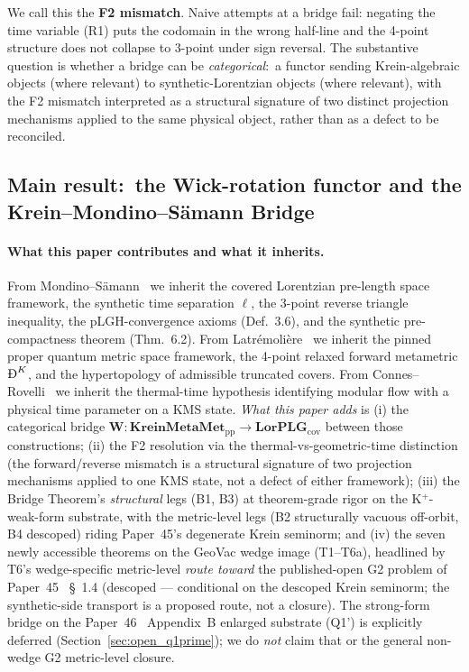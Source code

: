 \documentclass[11pt,a4paper]{article}
\theoremstyle{plain}
\theoremstyle{definition}
\newcommand{\BigDeth}{\text{\DJ}^{K}}
\newcommand{\Wfun}{\mathbf{W}}
\newcommand{\KreinMM}{\mathbf{KreinMetaMet}_{\mathrm{pp}}}
\newcommand{\LorPLG}{\mathbf{LorPLG}_{\mathrm{cov}}}
\begin{document}
We call this the \textbf{F2 mismatch}. Naive attempts at a bridge fail:
negating the time variable (R1) puts the codomain in the wrong
half-line and the 4-point structure does not collapse to 3-point under
sign reversal. The substantive question is whether a bridge can be
\emph{categorical}:\ a functor sending Krein-algebraic objects (where
relevant) to synthetic-Lorentzian objects (where relevant), with the
F2 mismatch interpreted as a structural signature of two distinct
projection mechanisms applied to the same physical object, rather than
as a defect to be reconciled.

\subsection{Main result:\ the Wick-rotation functor and the
Krein--Mondino--S\"amann Bridge}
\label{sec:main_result}

\paragraph*{What this paper contributes and what it inherits.}
From Mondino--S\"amann~\cite{mondino_samann2025_pointed} we inherit
the covered Lorentzian pre-length space framework, the synthetic time
separation $\ell$, the 3-point reverse triangle inequality, the
pLGH-convergence axioms (Def.~3.6), and the synthetic pre-compactness
theorem (Thm.~6.2). From
Latr\'emoli\`ere~\cite{latremoliere2025_hypertopology} we inherit the
pinned proper quantum metric space framework, the 4-point relaxed
forward metametric $\BigDeth$, and the hypertopology of admissible
truncated covers. From Connes--Rovelli~\cite{connes_rovelli1994} we
inherit the thermal-time hypothesis identifying modular flow with a
physical time parameter on a KMS state. \emph{What this paper adds}
is (i) the categorical bridge $\Wfun: \KreinMM \to \LorPLG$ between
those constructions; (ii) the F2 resolution via the
thermal-vs-geometric-time distinction (the forward/reverse mismatch
is a structural signature of two projection mechanisms applied to one
KMS state, not a defect of either framework); (iii) the Bridge
Theorem's \emph{structural} legs (B1, B3) at theorem-grade rigor on the
K$^{+}$-weak-form substrate, with the metric-level legs (B2 structurally
vacuous off-orbit, B4 descoped) riding Paper~45's degenerate Krein
seminorm; and (iv) the seven newly accessible theorems on the
GeoVac wedge image (T1--T6a), headlined by T6's wedge-specific
metric-level \emph{route toward} the published-open G2 problem of
Paper~45~\cite{paper45} \S~1.4 (descoped --- conditional on the descoped
Krein seminorm; the synthetic-side transport is a proposed route, not a closure). The strong-form bridge on the
Paper~46~\cite{paper46} Appendix~B enlarged substrate (Q1') is
explicitly deferred (Section~\ref{sec:open_q1prime}); we do
\emph{not} claim that or the general non-wedge G2 metric-level closure.
\end{document}
